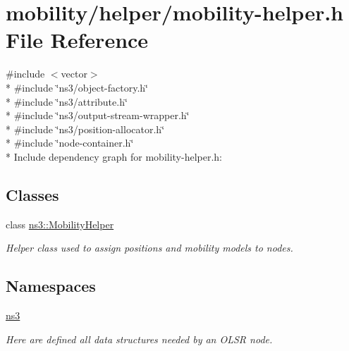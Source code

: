 \hypertarget{mobility-helper_8h}{}\section{mobility/helper/mobility-\/helper.h File Reference}
\label{mobility-helper_8h}
{\ttfamily \#include $<$vector$>$}\\*
{\ttfamily \#include \char`\"{}ns3/object-\/factory.\+h\char`\"{}}\\*
{\ttfamily \#include \char`\"{}ns3/attribute.\+h\char`\"{}}\\*
{\ttfamily \#include \char`\"{}ns3/output-\/stream-\/wrapper.\+h\char`\"{}}\\*
{\ttfamily \#include \char`\"{}ns3/position-\/allocator.\+h\char`\"{}}\\*
{\ttfamily \#include \char`\"{}node-\/container.\+h\char`\"{}}\\*
Include dependency graph for mobility-\/helper.h\+:
\subsection*{Classes}
\begin{DoxyCompactItemize}
\item 
class \hyperlink{classns3_1_1MobilityHelper}{ns3\+::\+Mobility\+Helper}
\begin{DoxyCompactList}\small\item\em Helper class used to assign positions and mobility models to nodes. \end{DoxyCompactList}\end{DoxyCompactItemize}
\subsection*{Namespaces}
\begin{DoxyCompactItemize}
\item 
 \hyperlink{namespacens3}{ns3}
\begin{DoxyCompactList}\small\item\em Here are defined all data structures needed by an O\+L\+SR node. \end{DoxyCompactList}\end{DoxyCompactItemize}
